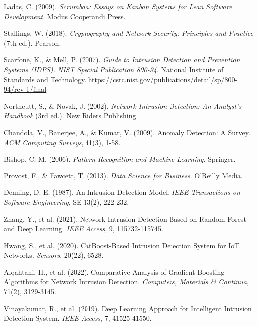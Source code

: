 \documentclass[12pt, letterpaper, oneside]{report}
\begin{document}
\begin{enumerate}[leftmargin=*, label={[\arabic*]}]

  \item Ladas, C. (2009). \textit{Scrumban: Essays on Kanban Systems for Lean Software Development}. Modus Cooperandi Press.

  \item Stallings, W. (2018). \textit{Cryptography and Network Security: Principles and Practice} (7th ed.). Pearson.

  \item Scarfone, K., \& Mell, P. (2007). \textit{Guide to Intrusion Detection and Prevention Systems (IDPS). NIST Special Publication 800-94}. National Institute of Standards and Technology. \url{https://csrc.nist.gov/publications/detail/sp/800-94/rev-1/final}

  \item Northcutt, S., \& Novak, J. (2002). \textit{Network Intrusion Detection: An Analyst's Handbook} (3rd ed.). New Riders Publishing.

  \item Chandola, V., Banerjee, A., \& Kumar, V. (2009). Anomaly Detection: A Survey. \textit{ACM Computing Surveys}, 41(3), 1-58.

  \item Bishop, C. M. (2006). \textit{Pattern Recognition and Machine Learning}. Springer.

  \item Provost, F., \& Fawcett, T. (2013). \textit{Data Science for Business}. O'Reilly Media.

  \item Denning, D. E. (1987). An Intrusion-Detection Model. \textit{IEEE Transactions on Software Engineering}, SE-13(2), 222-232.

  \item Zhang, Y., et al. (2021). Network Intrusion Detection Based on Random Forest and Deep Learning. \textit{IEEE Access}, 9, 115732-115745.

  \item Hwang, S., et al. (2020). CatBoost-Based Intrusion Detection System for IoT Networks. \textit{Sensors}, 20(22), 6528.

  \item Alqahtani, H., et al. (2022). Comparative Analysis of Gradient Boosting Algorithms for Network Intrusion Detection. \textit{Computers, Materials \& Continua}, 71(2), 3129-3145.

  \item Vinayakumar, R., et al. (2019). Deep Learning Approach for Intelligent Intrusion Detection System. \textit{IEEE Access}, 7, 41525-41550.


\end{enumerate}
\end{document}
